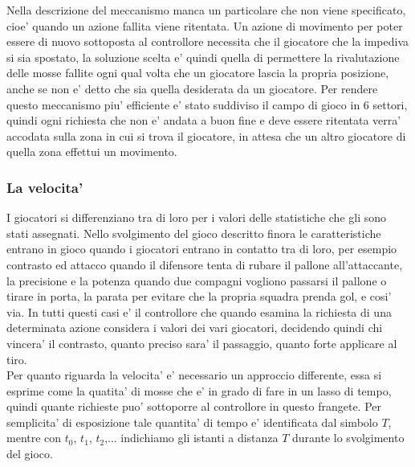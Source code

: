 Nella descrizione del meccanismo manca un particolare che non viene specificato, cioe’ quando un azione fallita viene ritentata. Un azione di movimento per poter essere di nuovo sottoposta al controllore necessita che il giocatore che la impediva si sia spostato, la soluzione scelta e’ quindi quella di permettere la rivalutazione delle mosse fallite ogni qual volta che un giocatore lascia la propria posizione, anche se non e’ detto che sia quella desiderata da un giocatore. Per rendere questo meccanismo piu’ efficiente e’ stato suddiviso il campo di gioco in 6 settori, quindi ogni richiesta che non e’ andata a buon fine e deve essere ritentata verra’ accodata sulla zona in cui si trova il giocatore, in attesa che un altro giocatore di quella zona effettui un movimento.

\subsubsection*{La velocita'}
%
\label{sec:analisi_concorrenza_velocita}

I giocatori si differenziano tra di loro per i valori delle statistiche che gli sono stati assegnati. Nello svolgimento del gioco descritto finora le caratteristiche entrano in gioco quando i giocatori entrano in contatto tra di loro, per esempio contrasto ed attacco quando il difensore tenta di rubare il pallone all’attaccante, la precisione e la potenza quando due compagni vogliono passarsi il pallone o tirare in porta, la parata per evitare che la propria squadra prenda gol, e cosi’ via. In tutti questi casi e’ il controllore che quando esamina la richiesta di una determinata azione considera i valori dei vari giocatori, decidendo quindi chi vincera’ il contrasto, quanto preciso sara’ il passaggio, quanto forte applicare al tiro.\\

Per quanto riguarda la velocita’ e’ necessario un approccio differente, essa si esprime come la quatita’ di mosse che e’ in grado di fare in un lasso di tempo, quindi quante richieste puo’ sottoporre al controllore in questo frangete. Per semplicita’ di esposizione tale quantita’ di tempo e’ identificata dal simbolo $T$, mentre con $t_0$, $t_1$, $t_2$,... indichiamo gli istanti a distanza $T$ durante lo svolgimento del gioco.\\

